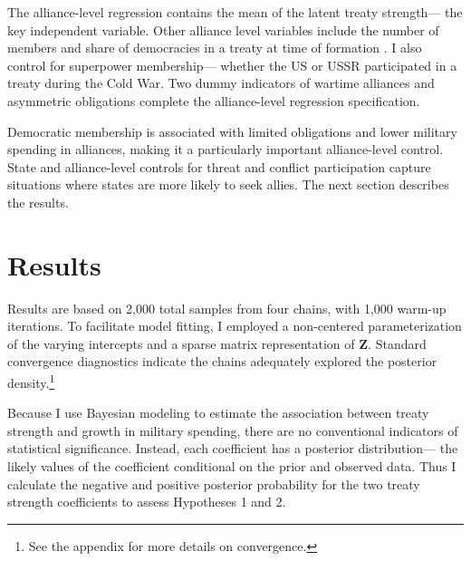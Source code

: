 \documentclass[12pt]{article}
\begin{document}
The alliance-level regression contains the mean of the latent treaty strength--- the key independent variable. 
Other alliance level variables include the number of members and share of democracies in a treaty at time of formation \citep{Chibaetal2015}.
I also control for superpower membership--- whether the US or USSR participated in a treaty during the Cold War. 
Two dummy indicators of wartime alliances and asymmetric obligations \citep{Leedsetal2002} complete the alliance-level regression specification. 


Democratic membership is associated with limited obligations \citep{Chibaetal2015} and lower military spending \citep{DigiuseppePoast2016} in alliances, making it a particularly important alliance-level control.  
State and alliance-level controls for threat and conflict participation capture situations where states are more likely to seek allies. 
The next section describes the results.
 

\section{Results}


Results are based on 2,000 total samples from four chains, with 1,000 warm-up iterations. 
To facilitate model fitting, I employed a non-centered parameterization of the varying intercepts and a sparse matrix representation of \textbf{Z}. 
Standard convergence diagnostics indicate the chains adequately explored the posterior density.\footnote{See the appendix for more details on convergence.} 


Because I use Bayesian modeling to estimate the association between treaty strength and growth in military spending, there are no conventional indicators of statistical significance. 
Instead, each coefficient has a posterior distribution--- the likely values of the coefficient conditional on the prior and observed data. 
Thus I calculate the negative and positive posterior probability for the two treaty strength coefficients to assess Hypotheses 1 and 2.
\end{document}
